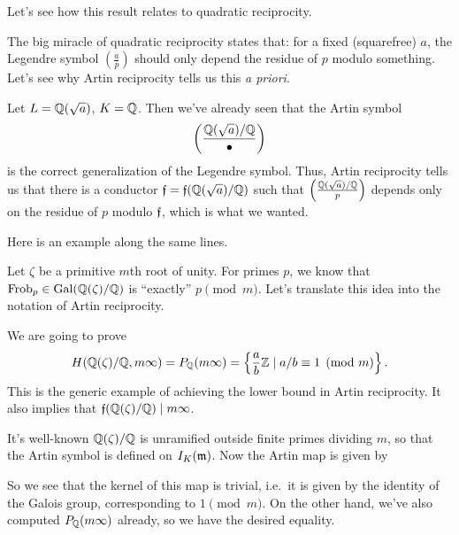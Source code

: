 Let's see how this result relates to quadratic reciprocity.
\begin{example}
	The big miracle of quadratic reciprocity states that:
	for a fixed (squarefree) $a$,
	the Legendre symbol $\left( \frac ap \right)$
	should only depend the residue of $p$ modulo something.
	Let's see why Artin reciprocity tells us this \emph{a priori}.

	Let $L = \mathbb Q(\sqrt a)$, $K = \mathbb Q$.
	Then we've already seen that the Artin symbol
	\[ \left( \frac{\mathbb Q(\sqrt a)/\mathbb Q}{\bullet} \right) \]
	is the correct generalization of the Legendre symbol.
	Thus, Artin reciprocity tells us that there is a conductor
	$\mathfrak f = \mathfrak f(\mathbb Q(\sqrt a)/\mathbb Q)$ such that
	$\left( \frac{\mathbb Q(\sqrt a)/\mathbb Q}{p} \right)$ depends only on
	the residue of $p$ modulo $\mathfrak f$, which is what we wanted.
\end{example}

Here is an example along the same lines.
\begin{example}
	\label{ex:artin_cyclotomic}
	Let $\zeta$ be a primitive $m$th root of unity.
	For primes $p$, we know that $\mathrm{Frob}_p \in \operatorname{Gal}(\mathbb Q(\zeta)/\mathbb Q)$
	is ``exactly'' $p \pmod m$.
	Let's translate this idea into the notation of Artin reciprocity.

	We are going to prove
	\[
		H(\mathbb Q(\zeta) / \mathbb Q,  m\infty)
		= P_\mathbb Q(m\infty)
		= \left\{ \frac ab \mathbb Z \mid a/b \equiv 1 \pmod m \right\}.
	\]
	This is the generic example of achieving the lower bound in Artin reciprocity.
	It also implies that $\mathfrak f(\mathbb Q(\zeta)/\mathbb Q) \mid m\infty$.

	It's well-known $\mathbb Q(\zeta)/\mathbb Q$ is unramified outside finite primes dividing $m$,
	so that the Artin symbol is defined on $I_K(\mathfrak m)$.
	Now the Artin map is given by
	\begin{center}
	\end{center}
	So we see that the kernel of this map is trivial,
	i.e.\ it is given by the identity of the Galois group,
	corresponding to $1 \pmod m$.
	On the other hand, we've also computed $P_\mathbb Q(m\infty)$ already,
	so we have the desired equality.
\end{example}

